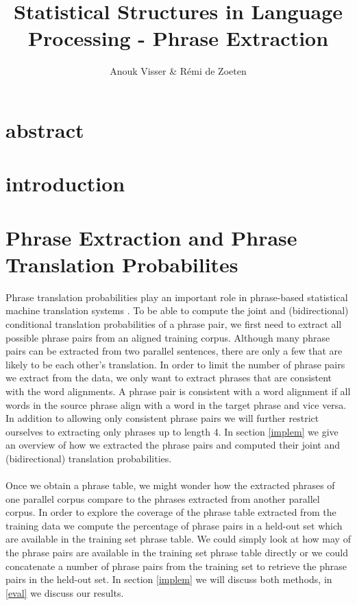 \documentclass[11pt]{article}
\title{Statistical Structures in Language Processing - Phrase Extraction}
\author{Anouk Visser \& R\'emi de Zoeten}
\date{}                                           %
\begin{document}
\maketitle
\newpage
\tableofcontents
\newpage

\section{abstract}
\section{introduction}
\section{Phrase Extraction and Phrase Translation Probabilites}
Phrase translation probabilities play an important role in phrase-based statistical machine translation systems \cite{koehn}. To be able to compute the joint and (bidirectional) conditional translation probabilities of a phrase pair, we first need to extract all possible phrase pairs from an aligned training corpus. Although many phrase pairs can be extracted from two parallel sentences, there are only a few that are likely to be each other's translation. In order to limit the number of phrase pairs we extract from the data, we only want to extract phrases that are consistent with the word alignments. A phrase pair is consistent with a word alignment if all words in the source phrase align with a word in the target phrase and vice versa.  In addition to allowing only consistent phrase pairs we will further restrict ourselves to extracting only phrases up to length 4. In section \ref{implem} we give an overview of how we extracted the phrase pairs and computed their joint and (bidirectional) translation probabilities.\\\\
Once we obtain a phrase table, we might wonder how the extracted phrases of one parallel corpus compare to the phrases extracted from another parallel corpus. In order to explore the coverage of the phrase table extracted from the training data we compute the percentage of phrase pairs in a held-out set which are available in the training set phrase table. We could simply look at how may of the phrase pairs are available in the training set phrase table directly or we could concatenate a number of phrase pairs from the training set to retrieve the phrase pairs in the held-out set. In section \ref{implem} we will discuss both methods, in \ref{eval} we discuss our results.
\end{document}
